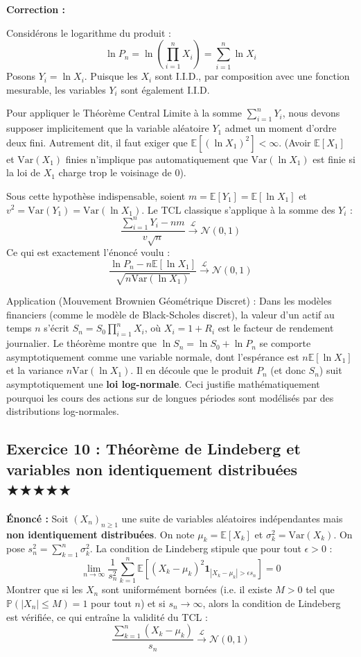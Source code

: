 \documentclass[11pt,a4paper]{article}
\begin{document}
\textbf{Correction :}

Considérons le logarithme du produit :
$$\ln P_n = \ln \left( \prod_{i=1}^n X_i \right) = \sum_{i=1}^n \ln X_i$$
Posons $Y_i = \ln X_i$. Puisque les $X_i$ sont I.I.D., par composition avec une fonction mesurable, les variables $Y_i$ sont également I.I.D.

Pour appliquer le Théorème Central Limite à la somme $\sum_{i=1}^n Y_i$, nous devons supposer implicitement que la variable aléatoire $Y_1$ admet un moment d'ordre deux fini. Autrement dit, il faut exiger que $\mathbb{E}[(\ln X_1)^2] < \infty$. (Avoir $\mathbb{E}[X_1]$ et $\text{Var}(X_1)$ finies n'implique pas automatiquement que $\text{Var}(\ln X_1)$ est finie si la loi de $X_1$ charge trop le voisinage de $0$).

Sous cette hypothèse indispensable, soient $m = \mathbb{E}[Y_1] = \mathbb{E}[\ln X_1]$ et $v^2 = \text{Var}(Y_1) = \text{Var}(\ln X_1)$.
Le TCL classique s'applique à la somme des $Y_i$ :
$$\frac{\sum_{i=1}^n Y_i - n m}{v \sqrt{n}} \xrightarrow{\mathcal{L}} \mathcal{N}(0, 1)$$
Ce qui est exactement l'énoncé voulu :
$$\frac{\ln P_n - n \mathbb{E}[\ln X_1]}{\sqrt{n \text{Var}(\ln X_1)}} \xrightarrow{\mathcal{L}} \mathcal{N}(0, 1)$$

Application (Mouvement Brownien Géométrique Discret) :
Dans les modèles financiers (comme le modèle de Black-Scholes discret), la valeur d'un actif au temps $n$ s'écrit $S_n = S_0 \prod_{i=1}^n X_i$, où $X_i = 1 + R_i$ est le facteur de rendement journalier.
Le théorème montre que $\ln S_n = \ln S_0 + \ln P_n$ se comporte asymptotiquement comme une variable normale, dont l'espérance est $n \mathbb{E}[\ln X_1]$ et la variance $n \text{Var}(\ln X_1)$.
Il en découle que le produit $P_n$ (et donc $S_n$) suit asymptotiquement une \textbf{loi log-normale}. Ceci justifie mathématiquement pourquoi les cours des actions sur de longues périodes sont modélisés par des distributions log-normales.


\vspace{1cm}
\subsection*{Exercice 10 : Théorème de Lindeberg et variables non identiquement distribuées \quad $\bigstar\bigstar\bigstar\bigstar\bigstar$}

\textbf{Énoncé :}
Soit $(X_n)_{n \ge 1}$ une suite de variables aléatoires indépendantes mais \textbf{non identiquement distribuées}. On note $\mu_k = \mathbb{E}[X_k]$ et $\sigma_k^2 = \text{Var}(X_k)$. On pose $s_n^2 = \sum_{k=1}^n \sigma_k^2$.
La condition de Lindeberg stipule que pour tout $\epsilon > 0$ :
$$\lim_{n \to \infty} \frac{1}{s_n^2} \sum_{k=1}^n \mathbb{E}\left[ (X_k - \mu_k)^2 \mathbf{1}_{|X_k - \mu_k| > \epsilon s_n} \right] = 0$$
Montrer que si les $X_n$ sont uniformément bornées (i.e. il existe $M > 0$ tel que $\mathbb{P}(|X_n| \le M) = 1$ pour tout $n$) et si $s_n \to \infty$, alors la condition de Lindeberg est vérifiée, ce qui entraîne la validité du TCL :
$$\frac{\sum_{k=1}^n (X_k - \mu_k)}{s_n} \xrightarrow{\mathcal{L}} \mathcal{N}(0, 1)$$
\end{document}
